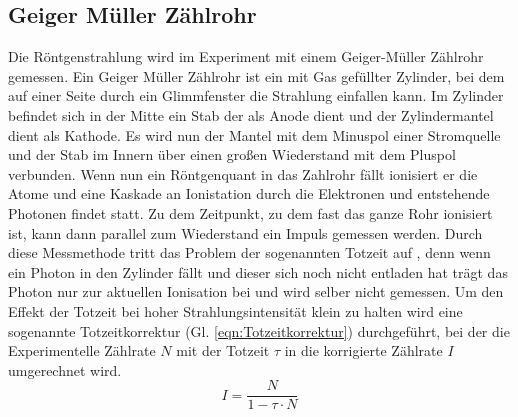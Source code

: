 \subsection{Geiger Müller Zählrohr}
Die Röntgenstrahlung wird im Experiment mit einem Geiger-Müller Zählrohr gemessen.
Ein Geiger Müller Zählrohr ist ein mit Gas gefüllter Zylinder, bei dem auf einer Seite durch ein Glimmfenster die Strahlung einfallen kann.
Im Zylinder befindet sich in der Mitte ein Stab der als Anode dient und der Zylindermantel dient als Kathode.
Es wird nun der Mantel mit dem Minuspol einer Stromquelle und der Stab im Innern über einen großen Wiederstand mit dem Pluspol verbunden.
Wenn nun ein Röntgenquant in das Zahlrohr fällt ionisiert er die Atome und eine Kaskade an Ionistation durch die Elektronen und entstehende Photonen findet statt.
Zu dem Zeitpunkt, zu dem fast das ganze Rohr ionisiert ist, kann dann parallel zum Wiederstand ein Impuls gemessen werden.
Durch diese Messmethode tritt das Problem der sogenannten Totzeit auf , denn wenn ein Photon in den Zylinder fällt und dieser sich noch nicht entladen hat trägt das Photon nur zur aktuellen Ionisation bei und wird selber nicht gemessen.
Um den Effekt der Totzeit bei hoher Strahlungsintensität klein zu halten wird eine sogenannte Totzeitkorrektur (Gl. \ref{eqn:Totzeitkorrektur}) durchgeführt, bei der die Experimentelle Zählrate $N$ mit der Totzeit $\tau$ in die korrigierte Zählrate $I$ umgerechnet wird.
\begin{equation}
    I  = \frac{N}{1-\tau \cdot N}    \label{eqn:Totzeitkorrektur}
\end{equation}

